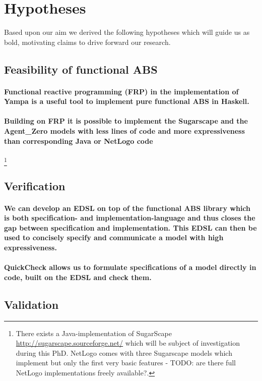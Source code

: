 \section{Hypotheses}
Based upon our aim we derived the following hypotheses which will guide us as bold, motivating claims to drive forward our research.

\subsection{Feasibility of functional ABS}
\paragraph{Functional reactive programming (FRP) in the implementation of Yampa is a useful tool to implement pure functional ABS in Haskell.}
\paragraph{Building on FRP it is possible to implement the Sugarscape and the Agent\_Zero models with less lines of code and more expressiveness than corresponding Java or NetLogo code} 
\footnote{There exists a Java-implementation of SugarScape \url{http://sugarscape.sourceforge.net/} which will be subject of investigation during this PhD. NetLogo comes with three Sugarscape models which implement but only the first very basic features - TODO: are there full NetLogo implementations freely available?.}

\subsection{Verification}
\paragraph{We can develop an EDSL on top of the functional ABS library which is both specification- and implementation-language and thus closes the gap between specification and implementation. This EDSL can then be used to concisely specify and communicate a model with high expressiveness.}
\paragraph{QuickCheck allows us to formulate specifications of a model directly in code, built on the EDSL and check them.}

\subsection{Validation}
